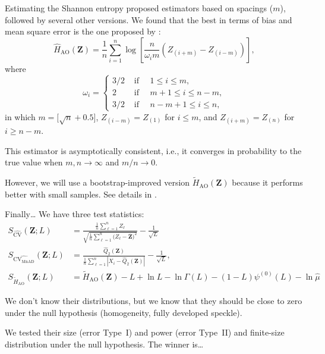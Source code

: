 \documentclass[table,aspectratio=169]{beamer}
\begin{document}
\begin{frame}[allowframebreaks]{Estimating the Shannon entropy}
\citet{vasicek1976test} proposed estimators based on spacings ($m$), followed by several other versions.
We found that the best in terms of bias and mean square error is the one proposed by
\citet{IbrahimAlOmari2014}:
 \[
	\widehat{H}_{\text{AO}}(\bm{Z})=\frac{1}{n} \sum_{i=1}^n \log \left[\frac{n}{\omega_i m}\left(Z_{(i+m)}-Z_{(i-m)}\right)\right],
	\] where \[
	\omega_i= \begin{cases}3/2 & \text { if }\quad 1 \leq i \leq m, \\ 2 & \text { if }\quad m+1 \leq i \leq n-m, \\ 3/2 & \text { if } \quad n-m+1 \leq i \leq n,\end{cases}
	\] 
	in which \(m=\big[\sqrt{n}+0.5\big]\), \(Z_{(i-m)}=Z_{(1)}\) for \(i \leq m\), and
	\(Z_{(i+m)}=Z_{(n)}\) for \(i \geq n-m\).

This estimator is asymptotically consistent, i.e., it converges in
probability to the true value when \(m,n\rightarrow\infty\) and
\(m/n\rightarrow0\). 

However, we will use a bootstrap-improved
version $\widetilde{H}_{\text{AO}}(\bm Z)$ because it performs better with small samples.
See details in \citet{IdentifyingHeterogeneityinSARDatawithNewTestStatistics}.
\end{frame}

\begin{frame}{Finally\dots}
	We have three test statistics:
	\begin{align*}
		S_{\widehat{\text{CV}}}(\bm Z;L) &= \frac{\frac1n \sum_{\ell=1}^n Z_\ell}{\sqrt{\frac1n \sum_{\ell=1}^n \big(Z_\ell-\overline{\bm Z}\big)^2}} - \frac1{\sqrt{L}} \\
		S_{\widehat{\text{CV}_{\text{MnAD}}}} (\bm Z;L) &= \frac{\widehat{Q}_2(\bm Z)}{\frac1n \sum_{\ell=1}^n|X_i-\widehat{Q}_2(\bm Z)|}-\frac1{\sqrt{L}},\\
		S_{\widetilde{H}_{\text{AO}}}(\bm{Z}; L) & = \widetilde{H}_{\text{AO}}(\bm Z) - L + \ln L - \ln\Gamma(L) - (1-L)\psi^{(0)}(L) - \ln \widehat{\mu}
	\end{align*}
	
We don't know their distributions, but we know that they should be close to zero under the null hypothesis (homogeneity, fully developed speckle).

We tested their size (error Type~I) and power (error Type~II) and finite-size distribution under the null hypothesis.
\alert{The winner is\dots}
\end{frame}
\end{document}
